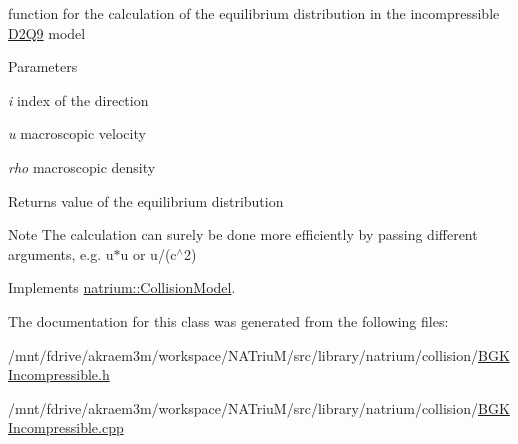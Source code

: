 function for the calculation of the equilibrium distribution in the incompressible \hyperlink{classnatrium_1_1D2Q9}{D2Q9} model 
\begin{DoxyParams}{Parameters}
\item[{\em i}]index of the direction \item[{\em u}]macroscopic velocity \item[{\em rho}]macroscopic density \end{DoxyParams}
\begin{DoxyReturn}{Returns}
value of the equilibrium distribution 
\end{DoxyReturn}
\begin{DoxyNote}{Note}
The calculation can surely be done more efficiently by passing different arguments, e.g. u$\ast$u or u/(c$^\wedge$2) 
\end{DoxyNote}


Implements \hyperlink{classnatrium_1_1CollisionModel_a88b382d63da80e950bc58e8afad769a6}{natrium::CollisionModel}.

The documentation for this class was generated from the following files:\begin{DoxyCompactItemize}
\item 
/mnt/fdrive/akraem3m/workspace/NATriuM/src/library/natrium/collision/\hyperlink{BGKIncompressible_8h}{BGKIncompressible.h}\item 
/mnt/fdrive/akraem3m/workspace/NATriuM/src/library/natrium/collision/\hyperlink{BGKIncompressible_8cpp}{BGKIncompressible.cpp}\end{DoxyCompactItemize}
